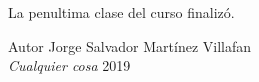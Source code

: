 \documentclass{book}
\begin{document}
La penultima clase del curso finalizó.

\begin{thebibliography}{9}
Autor Jorge Salvador Martínez Villafan\\
\textit{Cualquier cosa} 2019
\end{thebibliography}
	
	
\end{document}
